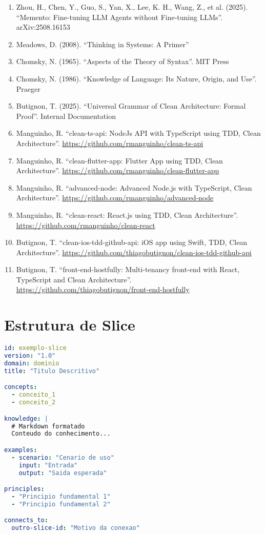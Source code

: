 \documentclass[11pt]{article}
\begin{document}
\begin{enumerate}
    \item Zhou, H., Chen, Y., Guo, S., Yan, X., Lee, K. H., Wang, Z., et al. (2025). ``Memento: Fine-tuning LLM Agents without Fine-tuning LLMs''. arXiv:2508.16153
    \item Meadows, D. (2008). ``Thinking in Systems: A Primer''
    \item Chomsky, N. (1965). ``Aspects of the Theory of Syntax''. MIT Press
    \item Chomsky, N. (1986). ``Knowledge of Language: Its Nature, Origin, and Use''. Praeger
    \item Butignon, T. (2025). ``Universal Grammar of Clean Architecture: Formal Proof''. Internal Documentation
    \item Manguinho, R. ``clean-ts-api: NodeJs API with TypeScript using TDD, Clean Architecture''. \url{https://github.com/rmanguinho/clean-ts-api}
    \item Manguinho, R. ``clean-flutter-app: Flutter App using TDD, Clean Architecture''. \url{https://github.com/rmanguinho/clean-flutter-app}
    \item Manguinho, R. ``advanced-node: Advanced Node.js with TypeScript, Clean Architecture''. \url{https://github.com/rmanguinho/advanced-node}
    \item Manguinho, R. ``clean-react: React.js using TDD, Clean Architecture''. \url{https://github.com/rmanguinho/clean-react}
    \item Butignon, T. ``clean-ios-tdd-github-api: iOS app using Swift, TDD, Clean Architecture''. \url{https://github.com/thiagobutignon/clean-ios-tdd-github-api}
    \item Butignon, T. ``front-end-hostfully: Multi-tenancy front-end with React, TypeScript and Clean Architecture''. \url{https://github.com/thiagobutignon/front-end-hostfully}
\end{enumerate}

\appendix

\section{Estrutura de Slice}

\begin{lstlisting}[language=yaml]
id: exemplo-slice
version: "1.0"
domain: dominio
title: "Titulo Descritivo"

concepts:
  - conceito_1
  - conceito_2

knowledge: |
  # Markdown formatado
  Conteudo do conhecimento...

examples:
  - scenario: "Cenario de uso"
    input: "Entrada"
    output: "Saida esperada"

principles:
  - "Principio fundamental 1"
  - "Principio fundamental 2"

connects_to:
  outro-slice-id: "Motivo da conexao"
\end{lstlisting}
\end{document}
